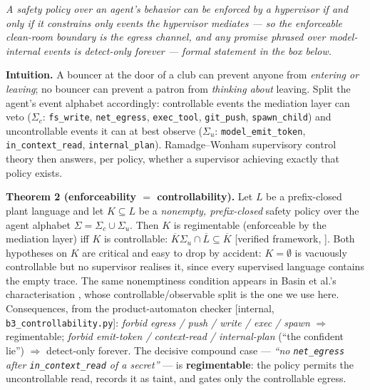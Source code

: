 \documentclass[11pt,a4paper]{article}
\newcommand{\onebreath}[1]{\begin{center}\emph{#1}\end{center}}
\begin{document}
\onebreath{A safety policy over an agent's behavior can be enforced by a hypervisor if and only if
it constrains only events the hypervisor mediates --- so the enforceable clean-room boundary is the egress channel, and any
promise phrased over model-internal events is detect-only forever --- formal statement in the box below.}

\textbf{Intuition.} A bouncer at the door of a club can prevent anyone from \emph{entering or leaving}; no bouncer can prevent a
patron from \emph{thinking about} leaving. Split the agent's event alphabet accordingly: controllable events the mediation layer
can veto ($\Sigma_c$: \texttt{fs\_write}, \texttt{net\_egress}, \texttt{exec\_tool}, \texttt{git\_push}, \texttt{spawn\_child})
and uncontrollable events it can at best observe ($\Sigma_u$: \texttt{model\_emit\_token}, \texttt{in\_context\_read},
\texttt{internal\_plan}). Ramadge--Wonham supervisory control theory \cite{ramadge-wonham} then answers, per policy, whether a
supervisor achieving exactly that policy exists.

\begin{thebox}
\textbf{Theorem 2 (enforceability $=$ controllability).} Let $L$ be a prefix-closed plant language and let $K\subseteq L$ be a
\emph{nonempty, prefix-closed} safety policy over the agent alphabet $\Sigma=\Sigma_c\cup\Sigma_u$. Then $K$ is regimentable
(enforceable by the mediation layer) iff $K$ is controllable: $\overline{K}\Sigma_u\cap \overline{L}\subseteq\overline{K}$
[verified framework, \cite{ramadge-wonham}]. Both hypotheses on $K$ are critical and easy to drop by accident: $K=\emptyset$
is vacuously controllable but no supervisor realises it, since every supervised language contains the empty trace. The same
nonemptiness condition appears in Basin et al.'s characterisation \cite{bjkz13}, whose controllable/observable split is the one
we use here. Consequences, from the
product-automaton checker [internal, \texttt{b3\_controllability.py}]: \emph{forbid egress / push / write / exec / spawn}
$\Rightarrow$ regimentable; \emph{forbid emit-token / context-read / internal-plan} (``the confident lie'') $\Rightarrow$
detect-only forever. The decisive compound case --- \emph{``no \texttt{net\_egress} after \texttt{in\_context\_read} of a
secret''} --- is \textbf{regimentable}: the policy permits the uncontrollable read, records it as taint, and gates only the
controllable egress.
\end{thebox}
\end{document}
